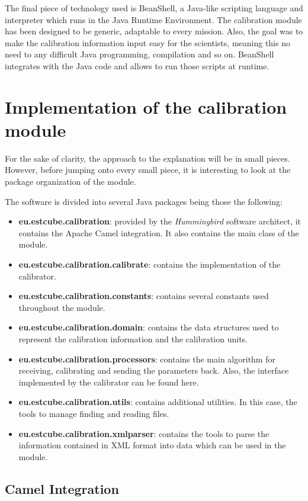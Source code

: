 The final piece of technology used is BeanShell\citep{BSH}, a Java-like scripting language and interpreter which runs in the Java Runtime Environment. The calibration module has been designed to be generic, adaptable to every mission. Also, the goal was to make the calibration information input easy for the scientists, meaning this no need to any difficult Java programming, compilation and so on. BeanShell integrates with the Java code and allows to run those scripts at runtime.

\section{Implementation of the calibration module}

For the sake of clarity, the approach to the explanation will be in small pieces. However, before jumping onto every small piece, it is interesting to look at the package organization of the module.

The software is divided into several Java packages being those the following:
\begin{itemize}
\item \textbf{eu.estcube.calibration}: provided by the \emph{Hummingbird} software architect, it contains the Apache Camel integration. It also contains the main class of the module.
\item \textbf{eu.estcube.calibration.calibrate}: contains the implementation of the calibrator.
\item \textbf{eu.estcube.calibration.constants}: contains several constants used throughout the module.
\item \textbf{eu.estcube.calibration.domain}: contains the data structures used to represent the calibration information and the calibration units.
\item \textbf{eu.estcube.calibration.processors}: contains the main algorithm for receiving, calibrating and sending the parameters back. Also, the interface implemented by the calibrator can be found here.
\item \textbf{eu.estcube.calibration.utils}: contains additional utilities. In this case, the tools to manage finding and reading files.
\item \textbf{eu.estcube.calibration.xmlparser}: contains the tools to parse the information contained in XML format into data which can be used in the module.
\end{itemize}

\subsection{Camel Integration}

